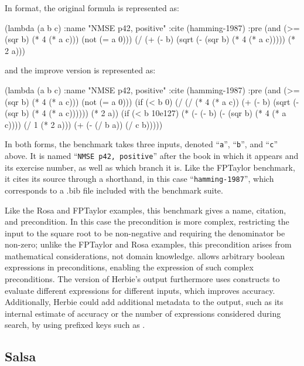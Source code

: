 \documentclass[main.tex]{subfiles}
\begin{document}
\noindent In \core format, the original formula is represented as:

\begin{code}
(lambda (a b c)
  :name "NMSE p42, positive"
  :cite (hamming-1987)
  :pre (and (>= (sqr b) (* 4 (* a c))) (not (= a 0)))
  (/ (+ (- b) (sqrt (- (sqr b) (* 4 (* a c))))) (* 2 a)))
\end{code}

\noindent and the improve version is represented as:

\begin{code}
(lambda (a b c)
  :name "NMSE p42, positive"
  :cite (hamming-1987)
  :pre (and (>= (sqr b) (* 4 (* a c))) (not (= a 0)))
  (if (< b 0)
      (/ (/ (* 4 (* a c)) (+ (- b) (sqrt (- (sqr b) (* 4 (* a c)))))) 
         (* 2 a))
      (if (< b 10e127)
          (* (- (- b) (- (sqr b) (* 4 (* a c)))) (/ 1 (* 2 a)))
          (+ (- (/ b a)) (/ c b)))))
\end{code}

In both forms, the benchmark takes three inputs, denoted
``\verb|a|'', ``\verb|b|'', and ``\verb|c|'' above. It is named
``\verb|NMSE p42, positive|'' after the book in which it appears and
its exercise number, as well as which branch it is. Like the FPTaylor
benchmark, it cites its source through a shorthand, in this case
``\verb|hamming-1987|'', which corresponds to a .bib file included
with the benchmark suite.

Like the Rosa and FPTaylor examples,
  this benchmark gives a name, citation, and precondition.
In this case the precondition is more complex,
  restricting the input to the square root to be non-negative
  and requiring the denominator be non-zero;
  unlike the FPTaylor and Rosa examples,
  this precondition arises from mathematical considerations,
  not domain knowledge.
\core allows arbitrary boolean expressions in preconditions,
  enabling the expression of such complex preconditions.
The \core version of Herbie's output
  furthermore uses  constructs to evaluate
  different expressions for different inputs,
  which improves accuracy.
Additionally, Herbie could add additional metadata to the output,
  such as its internal estimate of accuracy
  or the number of expressions considered during search,
  by using prefixed keys such as .

\subsection{Salsa}
\end{document}

